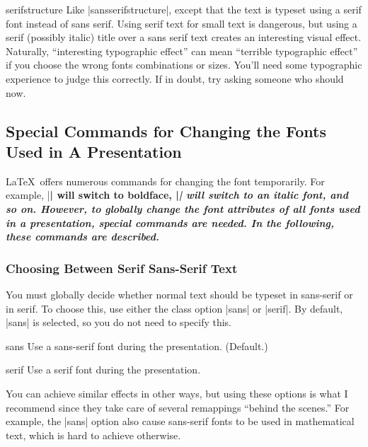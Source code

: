 \begin{fontthemeexample}{serifstructure}
  Like |sansserifstructure|, except that the text is typeset using a serif
  font instead of sans serif. Using serif text for small text is
  dangerous, but using a serif (possibly italic) title over a sans
  serif text creates an interesting visual effect. Naturally,
  ``interesting typographic effect'' can mean ``terrible typographic
  effect'' if you choose the wrong fonts combinations or sizes. You'll
  need some typographic  experience to judge this correctly. If in
  doubt, try asking someone who should now.
\end{fontthemeexample}





\subsection{Special Commands for Changing the Fonts Used in A Presentation}

\LaTeX\ offers numerous commands for changing the font
temporarily. For example, |\bfseries| will switch to boldface,
|\itshape| will switch to an italic font, and so on. However, to
globally change the font attributes of all fonts used in a
presentation, special commands are needed. In the following, these
commands are described.



\subsubsection{Choosing Between Serif Sans-Serif Text}

You must globally decide whether normal text should be typeset in
sans-serif or in serif. To choose this, use either the class option
|sans| or |serif|. By default, |sans| is selected, so you do not
need to specify this.

\begin{classoption}{sans}
  Use a sans-serif font during the presentation. (Default.)
\end{classoption}

\begin{classoption}{serif}
  Use a serif font during the presentation.
\end{classoption}

You can achieve similar effects in other ways, but using these options
is what I recommend since they take care of several remappings
``behind the scenes.'' For example, the |sans| option also cause
sans-serif fonts to be used in mathematical text, which is hard to
achieve otherwise.

